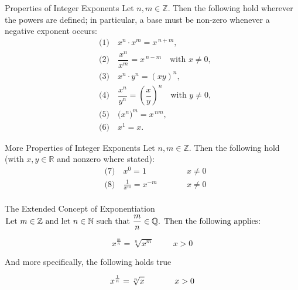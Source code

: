 \begin{proposition}{Properties of Integer Exponents}
Let $n,m\in\mathbb{Z}$. Then the following hold wherever the powers are defined; in particular, a base must be non-zero whenever a negative exponent occurs:
\[
\begin{aligned}
&\text{(1)}\quad x^{n}\cdot x^{m}=x^{\,n+m},\\[2pt]
&\text{(2)}\quad \dfrac{x^{n}}{x^{m}}=x^{\,n-m}\quad \text{with } x\neq 0,\\[2pt]
&\text{(3)}\quad x^{n}\cdot y^{n}=(xy)^{n},\\[2pt]
&\text{(4)}\quad \dfrac{x^{n}}{y^{n}}=\left(\dfrac{x}{y}\right)^{n}\quad \text{with } y\neq 0,\\[2pt]
&\text{(5)}\quad \bigl(x^{n}\bigr)^{m}=x^{\,nm},\\[2pt]
&\text{(6)}\quad x^{1}=x.
\end{aligned}
\]
\end{proposition}

\begin{proposition}{More Properties of Integer Exponents}
Let $n,m\in\mathbb{Z}$. Then the following hold (with $x,y\in\mathbb{R}$ and nonzero where stated):
\[
\begin{aligned}
&\text{(7)}\quad x^{0}=1   &\qquad&   x \neq 0  \\
&\text{(8)}\quad \frac{1}{x^{m}}=x^{-m} &\qquad& x \neq 0 \\
\end{aligned}
\]
\end{proposition}

\begin{definition}{The Extended Concept of Exponentiation}
$\textnormal{Let } m \in \mathbb{Z} \textnormal{ and let }  n \in \mathbb{N} \textnormal{ such that } \dfrac{m}{n} \in \mathbb{Q}  \textnormal{. Then the following applies:}$

\[
x^{\frac{m}{n}} = \sqrt[n]{x^m} \hspace{1cm} x > 0
\]

\textnormal{And more specifically, the following holds true}

\[
x^{\frac{1}{n}} = \sqrt[n]{x} \hspace{1.3cm} x > 0
\]

\end{definition}

